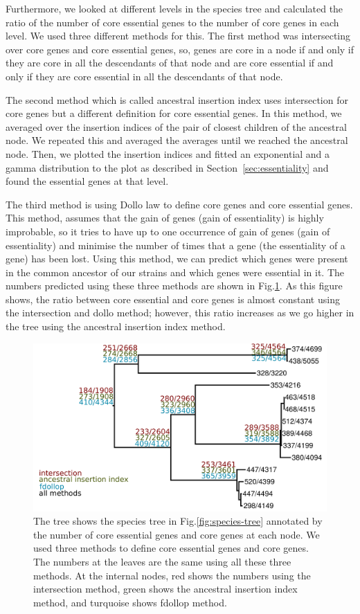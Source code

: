 \documentclass[12pt,letterpaper]{article}
\begin{document}
Furthermore, we looked at different levels in the species tree and calculated the ratio of the number of core essential genes to the number of core genes in each level. We used three different methods for this. The first method was intersecting over core genes and core essential genes, so, genes are core in a node if and only if they are core in all the descendants of that node and are core essential if and only if they are core essential in all the descendants of that node.

The second method which is called ancestral insertion index uses intersection for core genes but a different definition for core essential genes. In this method, we averaged over the insertion indices of the pair of closest children of the ancestral node. We repeated this and averaged the averages until we reached the ancestral node. Then, we plotted the insertion indices and fitted an exponential and a gamma distribution to the plot as described in Section~\ref{sec:essentiality} and found the essential genes at that level.

The third method is using Dollo law to define core genes and core essential genes. This method, assumes that the gain of genes (gain of essentiality) is highly improbable, so it tries to have up to one occurrence of gain of genes (gain of essentiality) and minimise the number of times that a gene (the essentiality of a gene) has been lost. Using this method, we can predict which genes were present in the common ancestor of our strains and which genes were essential in it. The numbers predicted using these three methods are shown in Fig.\@ \ref{fig:annotated-speciestree}. As this figure shows, the ratio between core essential and core genes is almost constant using the intersection and dollo method; however, this ratio increases as we go higher in the tree using the ancestral insertion index method.

\begin{figure}
\centering
\includegraphics[scale=0.2]{phylosift-aa-raxmlbootstrap-annotated.pdf}
\caption{The tree shows the species tree in Fig.\@\ref{fig:species-tree} annotated by the number of core essential genes and core genes at each node. We used three methods to define core essential genes and core genes. The numbers at the leaves are the same using all these three methods. At the internal nodes, red shows the numbers using the intersection method, green shows the ancestral insertion index method, and turquoise shows fdollop method.}
\label{fig:annotated-speciestree}
\end{figure}
\end{document}
